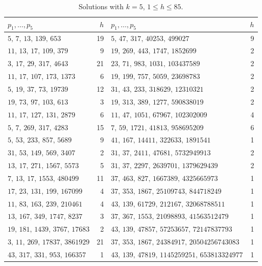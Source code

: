\documentclass[11pt,reqno]{amsart}
\numberwithin{equation}{section}
\theoremstyle{plain}
\theoremstyle{definition}
\theoremstyle{remark}
\begin{document}
\begin{table}[ht]
\centering
\caption{Solutions with $k=5$, $1\le h\le85$.}
\label{tab:S5}
\smallskip
\footnotesize
\begin{tabular}{@{}lr@{\qquad}lr@{}}
\toprule
$p_1,\dots,p_5$ & $h$ & $p_1,\dots,p_5$ & $h$ \\
\midrule
$5,\,7,\,13,\,139,\,653$ & 19 & $5,\,47,\,317,\,40253,\,499027$ & 9 \\
$11,\,13,\,17,\,109,\,379$ & 9 & $19,\,269,\,443,\,1747,\,1852699$ & 2 \\
$3,\,17,\,29,\,317,\,4643$ & 21 & $23,\,71,\,983,\,1031,\,103437589$ & 2 \\
$11,\,17,\,107,\,173,\,1373$ & 6 & $19,\,199,\,757,\,5059,\,23698783$ & 2 \\
$5,\,19,\,37,\,73,\,19739$ & 12 & $31,\,43,\,233,\,318629,\,12310321$ & 2 \\
$19,\,73,\,97,\,103,\,613$ & 3 & $19,\,313,\,389,\,1277,\,590838019$ & 2 \\
$11,\,17,\,127,\,131,\,2879$ & 6 & $11,\,47,\,1051,\,67967,\,102302009$ & 4 \\
$5,\,7,\,269,\,317,\,4283$ & 15 & $7,\,59,\,1721,\,41813,\,958695209$ & 6 \\
$5,\,53,\,233,\,857,\,5689$ & 9 & $41,\,167,\,14411,\,322633,\,1891541$ & 1 \\
$31,\,53,\,149,\,569,\,3407$ & 2 & $31,\,37,\,2411,\,47681,\,5732949913$ & 2 \\
$13,\,17,\,271,\,1567,\,5573$ & 5 & $31,\,37,\,2297,\,2639701,\,1379629439$ & 2 \\
$7,\,13,\,17,\,1553,\,480499$ & 11 & $37,\,463,\,827,\,1667389,\,4325665973$ & 1 \\
$17,\,23,\,131,\,199,\,167099$ & 4 & $37,\,353,\,1867,\,25109743,\,844718249$ & 1 \\
$11,\,83,\,163,\,239,\,210461$ & 4 & $43,\,139,\,61729,\,212167,\,32068788511$ & 1 \\
$13,\,167,\,349,\,1747,\,8237$ & 3 & $37,\,367,\,1553,\,21098893,\,41563512479$ & 1 \\
$19,\,181,\,1439,\,3767,\,17683$ & 2 & $43,\,139,\,47857,\,57253657,\,72147837793$ & 1 \\
$3,\,11,\,269,\,17837,\,3861929$ & 21 & $37,\,353,\,1867,\,24384917,\,20504256743083$ & 1 \\
$43,\,317,\,331,\,953,\,166357$ & 1 & $43,\,139,\,47819,\,1145259251,\,653813324977$ & 1 \\
\bottomrule
\end{tabular}
\end{table}
\end{document}

